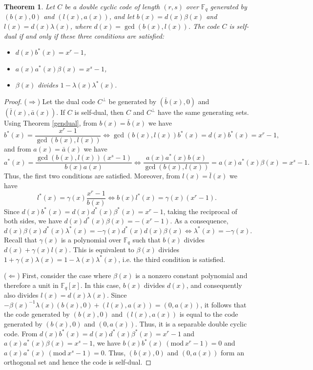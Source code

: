 \documentclass[10pt,a4paper]{amsart}
\newtheorem{theorem}{Theorem}
\newcommand{\Mod}[1]{\ (\mathrm{mod}\ #1)}
\begin{document}
	\begin{theorem}\label{charsddc}
		Let $C$ be a double cyclic code of length $(r,s)$ over $\mathbb{F}_q$ generated by $(b(x),0)$ and $(l(x),a(x))$, and let $b(x)=d(x)\beta(x)$ and $l(x)=d(x)\lambda(x)$, where $d(x)=\gcd(b(x),l(x))$. The code $C$ is self-dual if and only if these three conditions are satisfied:
		\begin{itemize}
			\item $d(x) b^{*}(x) = x^r-1$,
			\item $a(x)a^{*}(x)\beta(x)=x^s-1$,
			\item $\beta(x)$ divides $1-\lambda(x)\lambda^{*}(x)$.
		\end{itemize}
	\end{theorem}

	\begin{proof}
		($\Rightarrow$) Let the dual code $C^{\perp}$ be generated by $(\bar{b}(x),0)$ and $(\bar{l}(x),\bar{a}(x))$. If $C$ is self-dual, then $C$ and $C^{\perp}$ have the same generating sets. Using Theorem \ref{gendual}, from $b(x)=\bar{b}(x)$ we have $$b^{*}(x)=\frac{x^r-1}{\gcd(b(x),l(x))}\Leftrightarrow \gcd(b(x),l(x)) b^{*}(x) = d(x) b^{*}(x)= x^r-1,$$ and from $a(x)=\bar{a}(x)$ we have $$
		a^{*}(x)=\frac{\gcd(b(x),l(x))(x^s-1)}{b(x) a(x)} \Leftrightarrow \frac{a(x)a^{*}(x)b(x)}{\gcd(b(x),l(x))}=a(x)a^{*}(x)\beta(x)=x^s-1.$$
		Thus, the first two conditions are satisfied. Moreover, from $l(x)=\bar{l}(x)$ we have $$l^{*}(x)=\gamma(x) \frac{x^r-1}{b(x)}\Leftrightarrow b(x)l^{*}(x)=\gamma(x) (x^r-1).$$ Since $d(x)b^{*}(x)=d(x)d^{*}(x)\beta^{*}(x)=x^r-1$, taking the reciprocal of both sides, we have $d(x)d^{*}(x)\beta(x)=-(x^r-1)$. As a consequence, $$d(x)\beta(x) d^{*}(x)\lambda^{*}(x)=-\gamma(x)d^{*}(x)d(x)\beta(x)\Leftrightarrow \lambda^{*}(x)=-\gamma(x).$$
		Recall that $\gamma(x)$ is a polynomial over $\mathbb{F}_q$ such that $b(x)$ divides $d(x)+\gamma(x)l(x)$. This is equivalent to $\beta(x)$ divides $1+\gamma(x)\lambda(x)=1-\lambda(x)\lambda^{*}(x)$, i.e. the third condition is satisfied.
		
		($\Leftarrow$) First, consider the case where $\beta(x)$ is a nonzero constant polynomial and therefore a unit in $\mathbb{F}_q[x]$. In this case, $b(x)$ divides $d(x)$, and consequently also divides $l(x)=d(x)\lambda(x)$. Since $-\beta(x)^{-1}\lambda(x)(b(x),0)+(l(x),a(x))=(0,a(x))$, it follows that the code generated by $(b(x),0)$ and $(l(x),a(x))$ is equal to the code generated by $(b(x),0)$ and $(0,a(x))$. Thus, it is a separable double cyclic code. From $d(x)b^*(x)=d(x)d^*(x)\beta^*(x)=x^r-1$ and $a(x)a^{*}(x)\beta(x)=x^s-1$, we have $b(x)b^{*}(x)\Mod{x^r-1}=0$ and $a(x)a^{*}(x)\Mod{x^s-1}=0$. Thus, $(b(x),0)$ and $(0,a(x))$ form an orthogonal set and hence the code is self-dual.
		

\end{proof}
\end{document}
